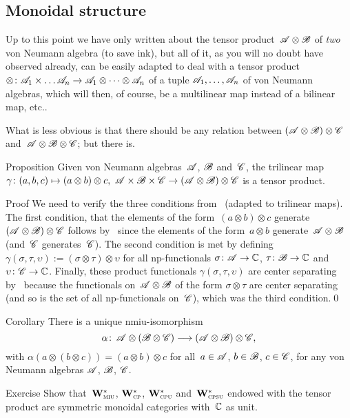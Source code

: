 \documentclass[a]{subfiles}
\begin{document}
\subsection{Monoidal structure}
\begin{parsec}%
\begin{point}%
Up to this point
we have only written about the tensor product~$\mathscr{A}\otimes \mathscr{B}$
of \emph{two} von Neumann algebra
(to save ink),
but all of it,
as you will no doubt have observed already,
can be easily adapted 
to deal with
a tensor product
$\otimes\colon \mathscr{A}_1\times\dotsc\mathscr{A}_n
\to\mathscr{A}_1\otimes \dotsb\otimes \mathscr{A}_n$
of a tuple $\mathscr{A}_1,\dotsc,\mathscr{A}_n$ of von Neumann algebras,
which will then, of course, be a multilinear map
instead of a bilinear map, etc..

What is less obvious
is that there should be any relation
between 
$(\mathscr{A}\otimes\mathscr{B})\otimes \mathscr{C}$
and~$\mathscr{A}\otimes\mathscr{B}\otimes\mathscr{C}$;
but there is.
\end{point}
\begin{point}{Proposition}%
Given von Neumann algebras~$\mathscr{A}$, $\mathscr{B}$ and~$\mathscr{C}$,
the trilinear map $\gamma\colon (a,b,c)\mapsto (a\otimes b)\otimes c,\ 
\scrA\times\scrB\times\scrC \to (\scrA\otimes \scrB)\otimes\scrC$
is a tensor product.
\begin{point}{Proof}%
We need to verify the three conditions
from~ (adapted
to trilinear maps).
The first condition,
that the elements of the form~$(a\otimes b)\otimes c$
generate $(\mathscr{A}\otimes \mathscr{B})\otimes \mathscr{C}$
follows
by~
since
the elements of the form~$a\otimes b$
generate~$\mathscr{A}\otimes \mathscr{B}$
(and~$\mathscr{C}$ generates~$\mathscr{C}$).
The second condition
is met by defining
$\gamma(\sigma,\tau,\upsilon):= (\sigma\otimes\tau)\otimes\upsilon$
for all np-functionals
$\sigma\colon \mathscr{A}\to\mathbb{C}$,
$\tau\colon \mathscr{B} \to\mathbb{C}$
and~$\upsilon\colon \mathscr{C}\to\mathbb{C}$.
Finally,
these product functionals
$\gamma(\sigma,\tau,\upsilon)$
are center separating by~
because
the functionals on~$\mathscr{A}\otimes \mathscr{B}$
of the form $\sigma\otimes\tau$
are center separating (and so is
the set of all np-functionals on~$\mathscr{C}$),
which was the third condition.\qed
\end{point}
\end{point}
\begin{point}{Corollary}%
There is a unique nmiu-isomorphism
\begin{equation*}
		\alpha\colon \, \mathscr{A}\otimes(\mathscr{B}\otimes \mathscr{C})
\longrightarrow  (\mathscr{A} \otimes \mathscr{B})\otimes\mathscr{C},
\end{equation*}
with $\alpha(a\otimes(b\otimes c))=(a\otimes b)\otimes c$
for all~$a\in\mathscr{A}$, $b\in\mathscr{B}$, $c\in\mathscr{C}$,
for any von Neumann algebras
$\mathscr{A}$, $\mathscr{B}$, $\mathscr{C}$.
\end{point}
\begin{point}[vn-smc]{Exercise}%
Show that~$\mathbf{W}^*_{\text{\textsc{miu}}}$, $\mathbf{W}^*_{\text{\textsc{cp}}}$, $\mathbf{W}^*_{\text{\textsc{cpu}}}$
and~$\mathbf{W}^*_{\text{\textsc{cpsu}}}$ endowed with the tensor product
are symmetric monoidal categories with~$\mathbb{C}$ as unit.
\end{point}
\end{parsec}
\end{document}
